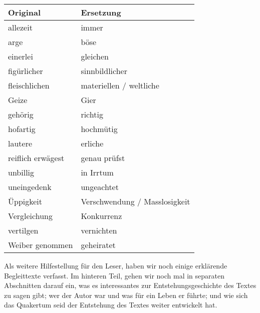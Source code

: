 \medskip

\begin{center}
\label{ref:tab_wortersetzungen}
\begin{tabular}{|l|l|} \hline
\textbf{Original}       & \textbf{Ersetzung}            \\ \hline \hline
allezeit                & immer                         \\ \hline
arge                    & böse                          \\ \hline
einerlei                & gleichen                      \\ \hline
figürlicher             & sinnbildlicher                \\ \hline
fleischlichen           & materiellen / weltliche       \\ \hline
Geize                   & Gier                          \\ \hline
gehörig                 & richtig                       \\ \hline
hofartig                & hochmütig                     \\ \hline
lautere                 & erliche                       \\ \hline
reiflich erwägest       & genau prüfst                  \\ \hline
unbillig                & in Irrtum                     \\ \hline
uneingedenk             & ungeachtet                    \\ \hline
Üppigkeit               & Verschwendung / Masslosigkeit \\ \hline
Vergleichung            & Konkurrenz                    \\ \hline
vertilgen               & vernichten                    \\ \hline
Weiber genommen         & geheiratet                    \\ \hline
\end{tabular}
\end{center}
\medskip

\medskip

Als weitere Hilfestellung für den Leser, haben wir noch einige erklärende
Begleittexte verfasst. Im hinteren Teil, gehen wir noch mal in separaten
Abschnitten darauf ein, was es interessantes zur Entstehungsgeschichte des
Textes zu sagen gibt; wer der Autor war und was für ein Leben er führte; und wie
sich das Quakertum seid der Entstehung des Textes weiter entwickelt hat.

